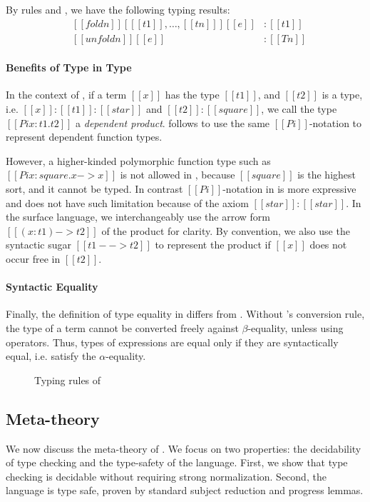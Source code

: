 By rules  and , we have the following
typing results:
\[\begin{array}{lll}
    &[[foldn]] [ [[t1]], \dots, [[tn]] ] [[e]] & : [[t1]] \\
    &[[unfoldn]] [[e]] & : [[Tn]]
\end{array}\]

\paragraph{Benefits of Type in Type}
In the context of \cc, if a term $[[x]]$ has the type $[[t1]]$, and
$[[t2]]$ is a type, i.e. $[[x]]:[[t1]]:[[star]]$ and
$[[t2]]:[[square]]$, we call the type $[[Pi x:t1.t2]]$ a
\emph{dependent product}. \ecore follows \cc to use the same
$[[Pi]]$-notation to represent dependent function types.

However, a higher-kinded polymorphic function type such as $[[Pi
    x:square.x->x]]$ is not allowed in \cc, because $[[square]]$ is
the highest sort, and it cannot be typed. In contrast $[[Pi]]$-notation in
\ecore is more expressive and does not have such limitation because of
the axiom $[[star]]:[[star]]$. In the surface language, we
interchangeably use the arrow form $[[(x:t1)->t2]]$ of the product for
clarity. By convention, we also use the syntactic sugar $[[t1 -->
    t2]]$ to represent the product if $[[x]]$ does not occur free in
$[[t2]]$.

\paragraph{Syntactic Equality}
Finally, the definition of type equality in \ecore differs from
\cc. Without \cc's conversion rule, the type of a term cannot be
converted freely against $\beta$-equality, unless using \cast
operators. Thus, types of expressions are equal only if they are
syntactically equal, i.e. satisfy the $\alpha$-equality.

\begin{figure}
    \ottdefnctx{}\ottinterrule
    \ottdefnexpr{}
    \caption{Typing rules of \ecore}
    \label{fig:ecore:typing}
\end{figure}

\subsection{Meta-theory}\label{sec:ecore:meta}
We now discuss the meta-theory of \ecore. We focus on two properties: the
decidability of type checking and the type-safety of the language. First, we
show that type checking \ecore is decidable without requiring strong
normalization. Second, the
language is type safe, proven by standard subject reduction and progress
lemmas.

